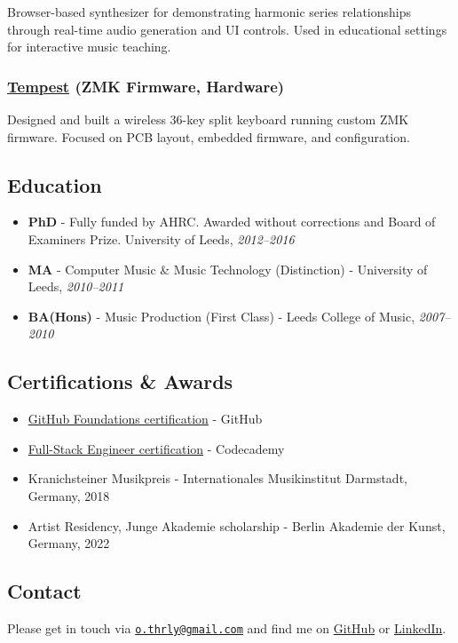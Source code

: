 \documentclass[10pt,a4paper]{article}
\providecommand{\tightlist}{%
  \setlength{\itemsep}{0pt}\setlength{\parskip}{0pt}}
\begin{document}
Browser-based synthesizer for demonstrating harmonic series
relationships through real-time audio generation and UI controls. Used
in educational settings for interactive music teaching.

\subsubsection{\texorpdfstring{\href{https://github.com/thrly/tempest}{Tempest}
(ZMK Firmware,
Hardware)}{Tempest (ZMK Firmware, Hardware)}}\label{tempest-zmk-firmware-hardware}

Designed and built a wireless 36-key split keyboard running custom ZMK
firmware. Focused on PCB layout, embedded firmware, and configuration.

\subsection{Education}\label{education}

\begin{itemize}
\tightlist
\item
  \textbf{PhD} - Fully funded by AHRC. Awarded without corrections and
  Board of Examiners Prize. University of Leeds, \emph{2012--2016}
\item
  \textbf{MA} - Computer Music \& Music Technology (Distinction) -
  University of Leeds, \emph{2010--2011}
\item
  \textbf{BA(Hons)} - Music Production (First Class) - Leeds College of
  Music, \emph{2007--2010}
\end{itemize}

\subsection{Certifications \& Awards}\label{certifications-awards}

\begin{itemize}
\tightlist
\item
  \href{https://www.credly.com/badges/8f2ca183-49d2-426a-8483-cbdb8f4efdbd/public_url}{GitHub
  Foundations certification} - GitHub
\item
  \href{https://www.codecademy.com/profiles/thrly/certificates/ffd0f42cce1a44e9a0108b365047a0a6}{Full-Stack
  Engineer certification} - Codecademy
\item
  Kranichsteiner Musikpreis - Internationales Musikinstitut Darmstadt,
  Germany, 2018
\item
  Artist Residency, Junge Akademie scholarship - Berlin Akademie der
  Kunst, Germany, 2022
\end{itemize}

\subsection{Contact}\label{contact}

Please get in touch via
\href{mailto:o.thrly@gmail.com}{\nolinkurl{o.thrly@gmail.com}} and find
me on \href{https://github.com/thrly}{GitHub} or
\href{https://www.linkedin.com/in/oliver-thurley}{LinkedIn}.
\end{document}
